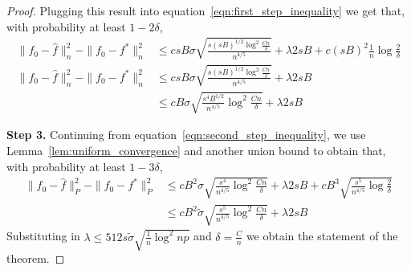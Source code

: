 \begin{proof}

Plugging this result into equation~\eqref{eqn:first_step_inequality}
we get that, with probability at least $1 - 2\delta$,
\begin{align}
\|f_0 - \hat{f} \|_n^2 - \| f_0 - f^* \|_n^2 
   &\leq c sB \sigma \sqrt{ 
   \frac{s (sB)^{1/2} \log^2 \frac{Cn}{\delta}}{n^{4/5}}}
   + \lambda 2 s B + c (sB)^2 \frac{1}{n} \log \frac{2}{\delta} \nonumber\\
\|f_0 - \hat{f} \|_n^2 - \| f_0 - f^* \|_n^2 
   &\leq c sB \sigma \sqrt{ 
   \frac{s (sB)^{1/2} \log^2 \frac{Cn}{\delta}}{n^{4/5}}}
   + \lambda 2 s B \nonumber\\   
   &\leq c B \sigma 
    \sqrt{ \frac{s^4 B^{1/2}}{n^{4/5}} \log^2 \frac{Cn}{\delta}} + \lambda 2 sB
\label{eqn:second_step_inequality}
\end{align}


\textbf{Step 3.} Continuing from
equation~\eqref{eqn:second_step_inequality}, we use
Lemma~\ref{lem:uniform_convergence} and another union bound to obtain
that, with probability at least $1-3\delta$,
\begin{align}
\|f_0 - \hat{f} \|_P^2 - \| f_0 - f^* \|_P^2 
   &\leq cB^2 \sigma 
    \sqrt{ \frac{s^4}{n^{4/5}} \log^2 \frac{Cn}{\delta}}
 +\lambda 2 s B + c B^3 \sqrt{ \frac{s^5}{n^{4/5}} \log \frac{2}{\delta}}
    \nonumber \\
&\leq c B^2 \tilde{\sigma} \sqrt{ \frac{s^5}{n^{4/5}} \log^2 \frac{Cn}{\delta}} + \lambda 2 sB \nonumber
\end{align}
Substituting in $\lambda \leq 512 s \tilde{\sigma} \sqrt{\frac{1}{n}
  \log^2 np}$ and $\delta = \frac{C}{n}$ we obtain the statement of
the theorem.
\end{proof}
 
